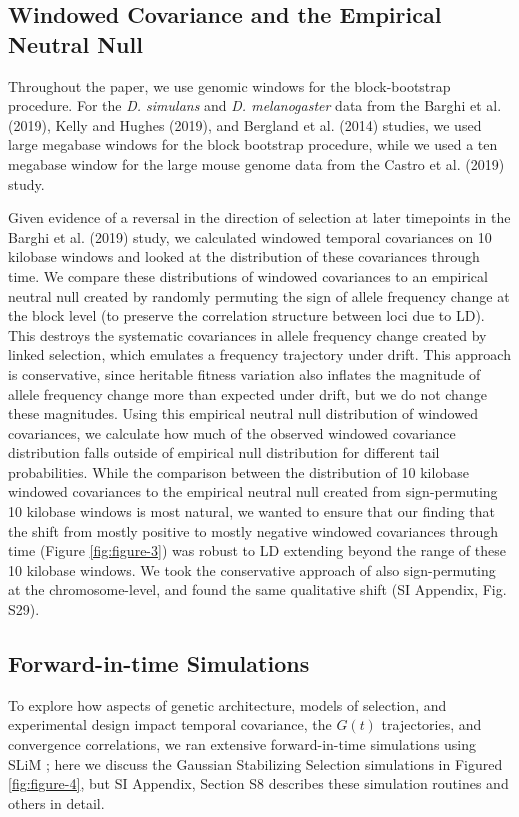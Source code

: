 \documentclass[9pt,twocolumn,twoside]{pnas-new}
\begin{document}
{\subsection*{Windowed Covariance and the Empirical Neutral Null}

Throughout the paper, we use genomic windows for the block-bootstrap procedure.
For the \emph{D. simulans} and \emph{D.  melanogaster} data from the
Barghi et al. (2019), Kelly and Hughes (2019), and
Bergland et al. (2014) studies, we used large megabase windows for the
block bootstrap procedure, while we used a ten megabase window for the large
mouse genome data from the Castro et al. (2019) study. 

Given evidence of a reversal in the direction of selection at later timepoints
in the Barghi et al. (2019) study, we calculated windowed temporal covariances
on 10 kilobase windows and looked at the distribution of these covariances
through time. We compare these distributions of windowed covariances to an
empirical neutral null created by randomly permuting the sign of allele
frequency change at the block level (to preserve the correlation structure
between loci due to LD). This destroys the systematic covariances in allele
frequency change created by linked selection, which emulates a frequency
trajectory under drift. This approach is conservative, since heritable fitness
variation also inflates the magnitude of allele frequency change more than
expected under drift, but we do not change these magnitudes. Using this
empirical neutral null distribution of windowed covariances, we calculate how
much of the observed windowed covariance distribution falls outside of
empirical null distribution for different tail probabilities. While the
comparison between the distribution of 10 kilobase windowed covariances to the
empirical neutral null created from sign-permuting 10 kilobase windows is most
natural, we wanted to ensure that our finding that the shift from mostly
positive to mostly negative windowed covariances through time (Figure
\ref{fig:figure-3}) was robust to LD extending beyond the range of these 10
kilobase windows. We took the conservative approach of also sign-permuting at
the chromosome-level, and found the same qualitative shift (SI Appendix, Fig.
S29).

\subsection*{Forward-in-time Simulations}

To explore how aspects of genetic architecture, models of selection, and
experimental design impact temporal covariance, the $G(t)$ trajectories, and
convergence correlations, we ran extensive forward-in-time simulations using
SLiM \cite{Haller2019-vu}; here we discuss the Gaussian Stabilizing Selection
simulations in Figured \ref{fig:figure-4}, but SI Appendix, Section S8
describes these simulation routines and others in detail.

}
\end{document}
